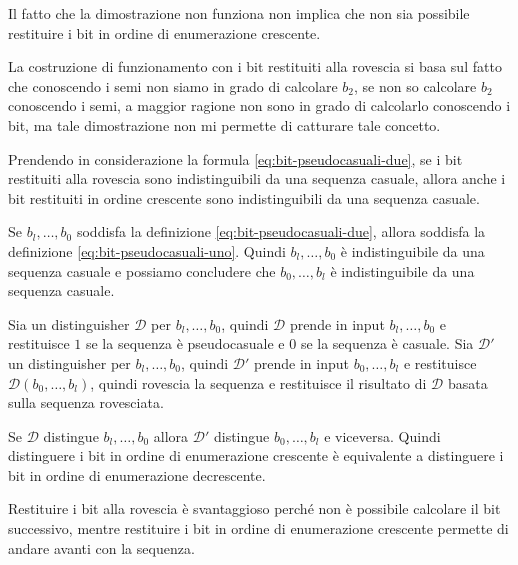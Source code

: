 Il fatto che la dimostrazione non funziona non implica che non sia possibile restituire 
i bit in ordine di enumerazione crescente.

La costruzione di funzionamento con i bit restituiti alla rovescia si basa sul fatto che
conoscendo i semi non siamo in grado di calcolare $b_2$, se non so calcolare $b_2$ 
conoscendo i semi, a maggior ragione non sono in grado di calcolarlo conoscendo
i bit, ma tale dimostrazione non mi permette di catturare tale concetto.

Prendendo in considerazione la formula \ref{eq:bit-pseudocasuali-due}, se i bit restituiti
alla rovescia sono indistinguibili da una sequenza casuale, allora anche i bit restituiti
in ordine crescente sono indistinguibili da una sequenza casuale.

\begin{tcolorbox}
  Se $b_l, \dots, b_0$ soddisfa la definizione \ref{eq:bit-pseudocasuali-due}, allora soddisfa 
  la definizione \ref{eq:bit-pseudocasuali-uno}. Quindi
  $b_l, \dots, b_0$ è indistinguibile da una sequenza casuale e possiamo concludere che
  $b_0, \dots, b_l$ è indistinguibile da una sequenza casuale.
\end{tcolorbox}
Sia un distinguisher $\mathcal{D}$ per $b_l, \dots, b_0$, quindi $\mathcal{D}$ prende in input
$b_l, \dots, b_0$ e restituisce $1$ se la sequenza è pseudocasuale e $0$ se la sequenza è casuale.
Sia $\mathcal{D}'$ un distinguisher per $b_l, \dots, b_0$, quindi $\mathcal{D}'$ prende in input
$b_0, \dots, b_l$ e restituisce $\mathcal{D}(b_0, \dots, b_l)$, quindi rovescia la sequenza e 
restituisce il risultato di $\mathcal{D}$ basata sulla sequenza rovesciata.

Se $\mathcal{D}$ distingue $b_l, \dots, b_0$ allora $\mathcal{D}'$ distingue $b_0, \dots, b_l$ 
e viceversa. Quindi distinguere i bit in ordine di enumerazione crescente è equivalente a distinguere i bit
in ordine di enumerazione decrescente.

Restituire i bit alla rovescia è svantaggioso perché non è possibile calcolare il bit successivo, mentre 
restituire i bit in ordine di enumerazione crescente permette di andare avanti con la sequenza.
